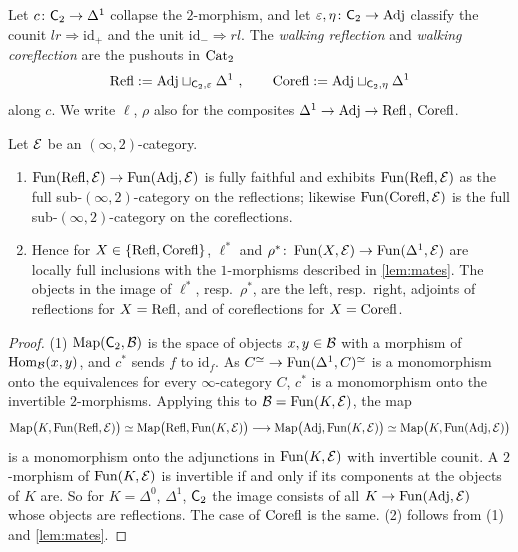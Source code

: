 %
Let
$c\colon \mathsf{C}_{2} \to \Delta^{1}$
collapse the $2$-morphism, and let
$\varepsilon,\eta\colon \mathsf{C}_{2} \to \mathrm{Adj}$
classify the counit
$lr \Rightarrow \mathrm{id}_{+}$
and the unit
$\mathrm{id}_{-} \Rightarrow rl$.
The \emph{walking reflection} and \emph{walking coreflection} are the pushouts
in $\mathrm{Cat}_{2}$
\begin{equation*}
\mathrm{Refl} := \mathrm{Adj} \sqcup_{\mathsf{C}_{2},\varepsilon} \Delta^{1} \ ,
\qquad \mathrm{Corefl} := \mathrm{Adj} \sqcup_{\mathsf{C}_{2},\eta} \Delta^{1}
\end{equation*}
along $c$. We write $\ell$, $\rho$ also for the composites
$\Delta^{1} \to \mathrm{Adj} \to \mathrm{Refl}$,
$\mathrm{Corefl}$.

\begin{lem}
\label{lem:mates-refl}
%
Let $\mathcal{E}$ be an $(\infty,2)$-category.
\begin{enumerate}
\item
$\operatorname{Fun}(\mathrm{Refl},\mathcal{E}) \to \operatorname{Fun}(\mathrm{Adj},\mathcal{E})$
is fully faithful and exhibits $\operatorname{Fun}(\mathrm{Refl},\mathcal{E})$ as the full
sub-$(\infty,2)$-category on the reflections;
likewise $\operatorname{Fun}(\mathrm{Corefl},\mathcal{E})$ is the full sub-$(\infty,2)$-category on the
coreflections.
\item Hence for
$X \in \{\mathrm{Refl},\mathrm{Corefl}\}$,
$\ell^{*}$ and
$\rho^{*}\colon \operatorname{Fun}(X,\mathcal{E}) \to \operatorname{Fun}(\Delta^{1},\mathcal{E})$
are locally full inclusions with the $1$-morphisms described in
\cref{lem:mates}. The objects in the image of $\ell^{*}$, resp.\ $\rho^{*}$,
are the left, resp.\ right, adjoints of reflections for $X = \mathrm{Refl}$,
and of coreflections for $X = \mathrm{Corefl}$.
\end{enumerate}
\end{lem}

\begin{proof}
%
(1) $\operatorname{Map}(\mathsf{C}_{2},\mathcal{B})$ is the space of objects $x,y \in \mathcal{B}$ with a morphism of
$\operatorname{Hom}_{\mathcal{B}}(x,y)$, and $c^{*}$ sends $f$ to $\mathrm{id}_{f}$. As
$C^{\simeq} \to \operatorname{Fun}(\Delta^{1},C)^{\simeq}$
is a monomorphism onto the equivalences for every $\infty$-category $C$,
$c^{*}$ is a monomorphism onto the invertible $2$-morphisms.
Applying this to $\mathcal{B} = \operatorname{Fun}(K,\mathcal{E})$, the map
\begin{equation*}
\operatorname{Map}\bigl(K,\operatorname{Fun}(\mathrm{Refl},\mathcal{E})\bigr) \simeq \operatorname{Map}\bigl(\mathrm{Refl},\operatorname{Fun}(K,\mathcal{E})\bigr)
\longrightarrow \operatorname{Map}\bigl(\mathrm{Adj},\operatorname{Fun}(K,\mathcal{E})\bigr) \simeq
\operatorname{Map}\bigl(K,\operatorname{Fun}(\mathrm{Adj},\mathcal{E})\bigr)
\end{equation*}
is a monomorphism onto the adjunctions in $\operatorname{Fun}(K,\mathcal{E})$ with invertible counit.
A $2$-morphism of $\operatorname{Fun}(K,\mathcal{E})$ is invertible if and only if its components at
the objects of $K$ are.
So for $K = \Delta^{0}$, $\Delta^{1}$, $\mathsf{C}_{2}$ the image consists of all $K \to
\operatorname{Fun}(\mathrm{Adj},\mathcal{E})$ whose objects are reflections.
The case of $\mathrm{Corefl}$ is the same.
(2) follows from (1) and \cref{lem:mates}.
\end{proof}

